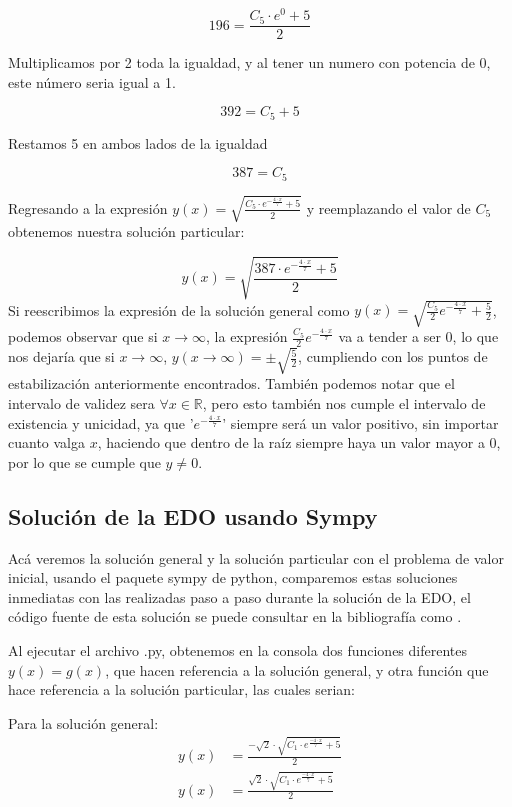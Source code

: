 \documentclass{article}
\begin{document}
\[
 196=\frac{C_5\cdot e^{0}+5}{2}
\] 

Multiplicamos por 2 toda la igualdad, y al tener un numero con potencia de 0, este número seria igual a 1.

\[
 392=C_5+5
\] 

Restamos 5 en ambos lados de la igualdad

\[
 387=C_5
\]

Regresando a la expresión \(y(x) = \sqrt{\frac{C_5\cdot e^{-\frac{4\cdot x}{7}}+5}{2}}\) y reemplazando el valor de \(C_5\) obtenemos nuestra solución particular:

\[
 y(x) = \sqrt{\frac{387\cdot e^{-\frac{4\cdot x}{7}}+5}{2}}
\]
Si reescribimos la expresión de la solución general como \(y(x)=\sqrt{\frac{C_5}{2}e^{-\frac{4\cdot x}{7}}+\frac{5}{2}}\), podemos observar que si \(x \to \infty\), la expresión \(\frac{C_5}{2}e^{-\frac{4\cdot x}{7}}\) va a tender a ser 0, lo que nos dejaría que si \(x \to \infty\), \(y(x\to \infty)=\pm\sqrt{\frac{5}{2}}\), cumpliendo con los puntos de estabilización anteriormente encontrados. También podemos notar que el intervalo de validez sera \(\forall x \in \mathbb{R}\), pero esto también nos cumple el intervalo de existencia y unicidad, ya que '\( e^{-\frac{4\cdot x}{7}}\)' siempre será un valor positivo, sin importar cuanto valga \(x\), haciendo que dentro de la raíz siempre haya un valor mayor a 0, por lo que se cumple que \(y\neq0\). 

\subsection{Solución de la EDO usando Sympy}

Acá veremos la solución general y la solución particular con el problema de valor inicial, usando el paquete sympy de python, comparemos estas soluciones inmediatas con las realizadas paso a paso durante la solución de la EDO, el código fuente de esta solución se puede consultar en la bibliografía como \cite{codigo_mapaPendiente}.

Al ejecutar el archivo .py, obtenemos en la consola dos funciones diferentes\(y(x)=g(x)\), que hacen referencia a la solución general, y otra función que hace referencia a la solución particular, las cuales serian:

Para la solución general:
\begin{align*}
y(x)&=\frac{-\sqrt{2}\cdot\sqrt{C_1\cdot e^{\frac{-4\cdot x}{7}}+5}}{2} \\
y(x)&=\frac{\sqrt{2}\cdot\sqrt{C_1\cdot e^{\frac{-4\cdot x}{7}}+5}}{2} 
\end{align*}
\end{document}
